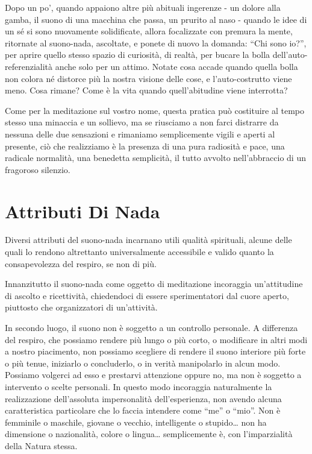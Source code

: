 Dopo un po', quando appaiono altre più abituali ingerenze - un dolore
alla gamba, il suono di una macchina che passa, un prurito al naso -
quando le idee di un sé si sono nuovamente solidificate, allora
focalizzate con premura la mente, ritornate al suono-nada, ascoltate, e
ponete di nuovo la domanda: ``Chi sono io?'', per aprire quello stesso
spazio di curiosità, di realtà, per bucare la bolla
dell'auto-referenzialità anche solo per un attimo. Notate cosa accade
quando quella bolla non colora né distorce più la nostra visione delle
cose, e l'auto-costrutto viene meno. Cosa rimane? Come è la vita quando
quell'abitudine viene interrotta?

Come per la meditazione sul vostro nome, questa pratica può costituire
al tempo stesso una minaccia e un sollievo, ma se riusciamo a non farci
distrarre da nessuna delle due sensazioni e rimaniamo semplicemente
vigili e aperti al presente, ciò che realizziamo è la presenza di una
pura radiosità e pace, una radicale normalità, una benedetta semplicità,
il tutto avvolto nell'abbraccio di un fragoroso silenzio.

\section{Attributi Di Nada}

Diversi attributi del suono-nada incarnano utili qualità spirituali,
alcune delle quali lo rendono altrettanto universalmente accessibile e
valido quanto la consapevolezza del respiro, se non di più.

Innanzitutto il suono-nada come oggetto di meditazione incoraggia
un'attitudine di ascolto e ricettività, chiedendoci di essere
sperimentatori dal cuore aperto, piuttosto che organizzatori di
un'attività.

In secondo luogo, il suono non è soggetto a un controllo personale. A
differenza del respiro, che possiamo rendere più lungo o più corto, o
modificare in altri modi a nostro piacimento, non possiamo scegliere di
rendere il suono interiore più forte o più tenue, iniziarlo o
concluderlo, o in verità manipolarlo in alcun modo. Possiamo volgerci ad
esso e prestarvi attenzione oppure no, ma non è soggetto a intervento o
scelte personali. In questo modo incoraggia naturalmente la
realizzazione dell'assoluta impersonalità dell'esperienza, non avendo
alcuna caratteristica particolare che lo faccia intendere come ``me'' o
``mio''. Non è femminile o maschile, giovane o vecchio, intelligente o
stupido\ldots{} non ha dimensione o nazionalità, colore o lingua\ldots{}
semplicemente è, con l'imparzialità della Natura stessa.

